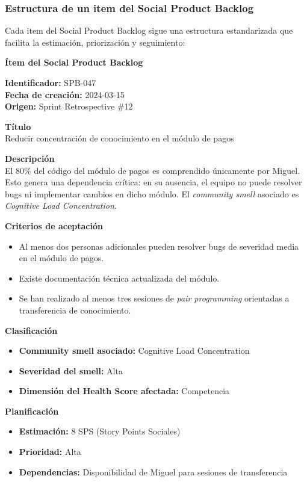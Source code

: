 \subsubsection{Estructura de un item del Social Product Backlog}

Cada item del Social Product Backlog sigue una estructura estandarizada que facilita la estimación, priorización y seguimiento:

\begin{protocolo}
    \textbf{Ítem del Social Product Backlog}

    \textbf{Identificador:} SPB-047 \\
    \textbf{Fecha de creación:} 2024-03-15 \\
    \textbf{Origen:} Sprint Retrospective \#12

    \medskip
    \textbf{Título}\\
    Reducir concentración de conocimiento en el módulo de pagos

    \medskip
    \textbf{Descripción}\\
    El 80\% del código del módulo de pagos es comprendido únicamente por Miguel.
    Esto genera una dependencia crítica: en su ausencia, el equipo no puede
    resolver bugs ni implementar cambios en dicho módulo.
    El \emph{community smell} asociado es \emph{Cognitive Load Concentration}.

    \medskip
    \textbf{Criterios de aceptación}
    \begin{itemize}
        \item Al menos dos personas adicionales pueden resolver bugs de severidad media en el módulo de pagos.
        \item Existe documentación técnica actualizada del módulo.
        \item Se han realizado al menos tres sesiones de \emph{pair programming} orientadas a transferencia de conocimiento.
    \end{itemize}

    \medskip
    \textbf{Clasificación}
    \begin{itemize}
        \item \textbf{Community smell asociado:} Cognitive Load Concentration
        \item \textbf{Severidad del smell:} Alta
        \item \textbf{Dimensión del Health Score afectada:} Competencia
    \end{itemize}

    \medskip
    \textbf{Planificación}
    \begin{itemize}
        \item \textbf{Estimación:} 8 SPS (Story Points Sociales)
        \item \textbf{Prioridad:} Alta
        \item \textbf{Dependencias:} Disponibilidad de Miguel para sesiones de transferencia
    \end{itemize}


\end{protocolo}
